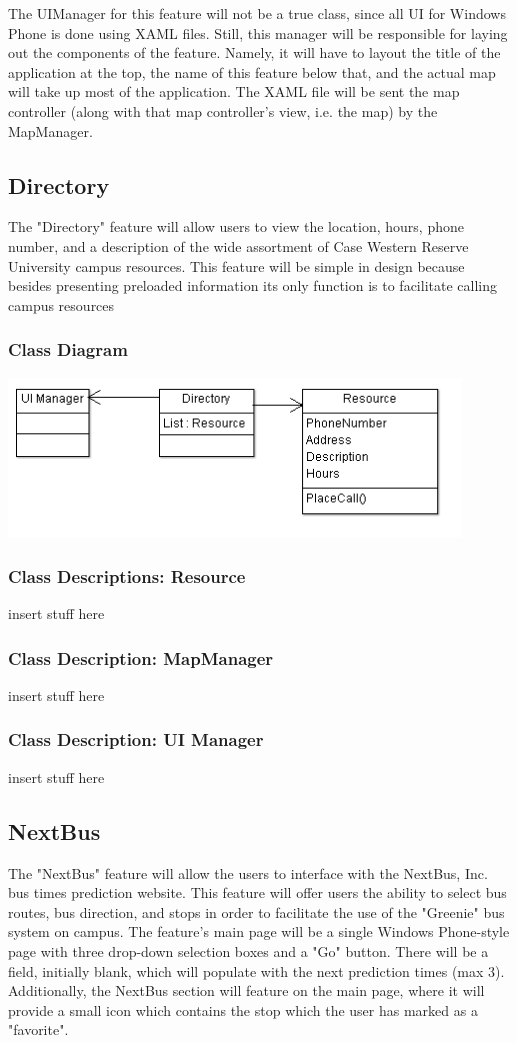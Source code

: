 \documentclass[pdftex,12pt,letter]{article}
\begin{document}
The UIManager for this feature will not be a true class, since all UI for Windows Phone is done using XAML files. Still, this manager will be responsible for laying out the components of the feature. Namely, it will have to layout the title of the application at the top, the name of this feature below that, and the actual map will take up most of the application. The XAML file will be sent the map controller (along with that map controller's view, i.e. the map)  by the MapManager.
\subsection{Directory}
The "Directory" feature will allow users to view the location, hours, phone number, and a description of the wide assortment of Case Western Reserve University campus resources. This feature will be simple in design because besides presenting preloaded information its only function is to facilitate calling campus resources 
\subsubsection{Class Diagram}
\begin{flushleft}
\includegraphics[width=120mm]{DirectoryCD.png}
\end{flushleft}
\subsubsection{Class Descriptions: Resource}
insert stuff here
\subsubsection{Class Description: MapManager}
insert stuff here
\subsubsection{Class Description: UI Manager}
insert stuff here

\subsection{NextBus}
The "NextBus" feature will allow the users to interface with the NextBus, Inc. bus times prediction website. This feature will offer users the ability to select bus routes, bus direction, and stops in order to facilitate the use of the "Greenie" bus system on campus. The feature's main page will be a single Windows Phone-style page with three drop-down selection boxes and a "Go" button. There will be a field, initially blank, which will populate with the next prediction times (max 3). Additionally, the NextBus section will feature on the main page, where it will provide a small icon which contains the stop which the user has marked as a "favorite".
\end{document}
